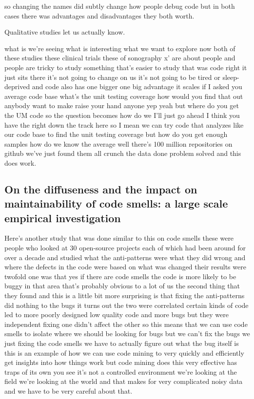 \documentclass[conference, compsoc, twoside]{IEEEtran}
\begin{document}
  so changing the names did subtly change how
 people debug code but in both cases there was advantages
 and disadvantages they both worth. 

Qualitative studies let us actually know.





what is we're seeing what
is interesting what we want to explore
now both of these studies these clinical
trials these of sonography x' are about
people and people are tricky to study
something that's easier to study that
was code right it just sits there it's
not going to change on us it's not going
to be tired or sleep-deprived and code
also has one bigger one big advantage it
scales if I asked you average code base
what's the unit testing coverage how
would you find that out anybody want to
make raise your hand anyone yep yeah but
where do you get the UM code so the
question becomes how do we I'll just go
ahead I think you have the right down
the track here so I mean we can try code
that analyzes like our code base to find
the unit testing coverage but how do you
get enough samples how do we know the
average well there's 100 million
repositories on github we've just found
them all crunch the data done problem solved and this does work.

\subsection{On the diffuseness and the impact on maintainability of code smells: a large scale empirical investigation}
Here's another study that was done similar to this on code
smells these were people who looked at
30 open-source projects each of which
had been around for over a decade and
studied what the anti-patterns were what
they did wrong and where the defects in
the code were based on what was changed
their results were twofold one was that
yes if there are code smells the code is
more likely to be buggy in that area
that's probably obvious to a lot of us
the second thing that they found and
this is a little bit more surprising is
that
fixing the anti-patterns did nothing to
the bugs it turns out the two were
correlated certain kinds of code led to
more poorly designed low quality code
and more bugs but they were independent
fixing one didn't affect the other so
this means that we can use code smells
to isolate where we should be looking
for bugs but we can't fix the bugs we
just fixing the code smells we have to
actually figure out what the bug itself
is this is an example of how we can use
code mining to very quickly and
efficiently get insights into how things
work but code mining does this very
effective has traps of its own you see
it's not a controlled environment we're
looking at the field we're looking at
the world and that makes for very
complicated noisy data and we have to be
very careful about that.
\end{document}
